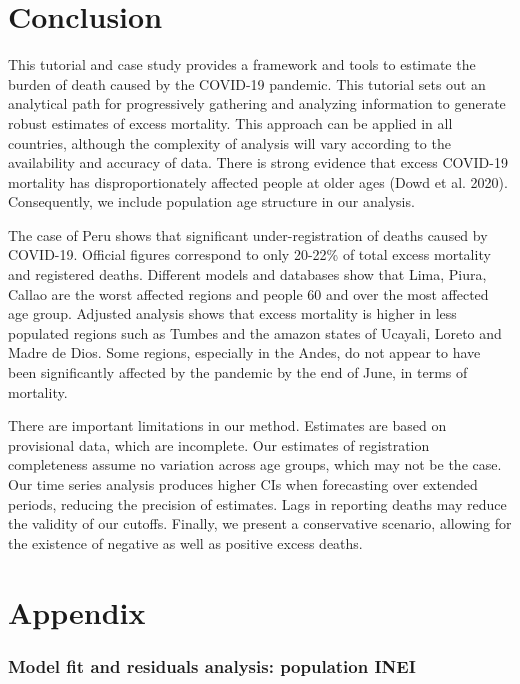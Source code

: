 \documentclass[
]{article}
\begin{document}
\hypertarget{conclusion}{%
\section{Conclusion}\label{conclusion}}

This tutorial and case study provides a framework and tools to estimate the burden of death caused by the COVID-19 pandemic. This tutorial sets out an analytical path for progressively gathering and analyzing information to generate robust estimates of excess mortality. This approach can be applied in all countries, although the complexity of analysis will vary according to the availability and accuracy of data. There is strong evidence that excess COVID-19 mortality has disproportionately affected people at older ages (Dowd et al. 2020). Consequently, we include population age structure in our analysis.

The case of Peru shows that significant under-registration of deaths caused by COVID-19. Official figures correspond to only 20-22\% of total excess mortality and registered deaths. Different models and databases show that Lima, Piura, Callao are the worst affected regions and people 60 and over the most affected age group. Adjusted analysis shows that excess mortality is higher in less populated regions such as Tumbes and the amazon states of Ucayali, Loreto and Madre de Dios. Some regions, especially in the Andes, do not appear to have been significantly affected by the pandemic by the end of June, in terms of mortality.

There are important limitations in our method. Estimates are based on provisional data, which are incomplete. Our estimates of registration completeness assume no variation across age groups, which may not be the case. Our time series analysis produces higher CIs when forecasting over extended periods, reducing the precision of estimates. Lags in reporting deaths may reduce the validity of our cutoffs. Finally, we present a conservative scenario, allowing for the existence of negative as well as positive excess deaths.

\hypertarget{Appendix}{%
\section{Appendix}\label{Appendix}}

\hypertarget{model-fit-and-residuals-analysis-population-inei}{%
\subsubsection{Model fit and residuals analysis: population INEI}\label{model-fit-and-residuals-analysis-population-inei}}
\end{document}
